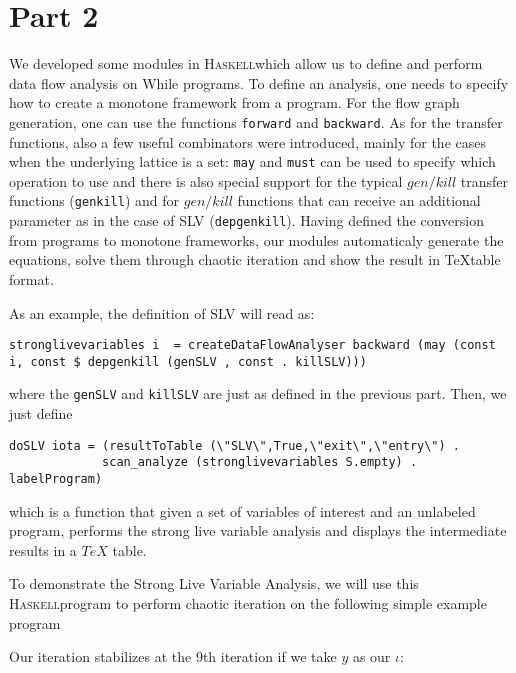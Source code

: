 \documentclass[a4wide,12pt]{article}
\def\haskell{\textsc{Haskell}}
\def\program#1{\fbox{\begin{minipage}{0.5\textwidth}\protect{$\begin{array}{ll} #1 \end{array}$}\end{minipage}}}
\def\hs#1{\texttt{#1}}
\begin{document}
 
\section{Part 2}
 
We developed some modules in \haskell which allow us to define and perform
data flow analysis on While programs. To define an analysis,
one needs to specify how to create a monotone framework from a program.
For the flow graph generation, one can use the functions \hs{forward} and \hs{backward}.
As for the transfer functions, also a few useful combinators were introduced, mainly
for the cases when the underlying lattice is a set: \hs{may} and \hs{must}
can be used to specify which operation to use and there is also special support
for the typical $gen/kill$ transfer functions (\hs{genkill}) and for
$gen/kill$ functions that can receive an additional parameter as in the case of SLV
(\hs{depgenkill}). Having defined the conversion from programs to monotone frameworks,
our modules automaticaly generate the equations, solve them through chaotic iteration
and show the result in \TeX table format. 

As an example, the definition of SLV will read as:

{\small
\begin{verbatim}
stronglivevariables i  = createDataFlowAnalyser backward (may (const i, const $ depgenkill (genSLV , const . killSLV)))
\end{verbatim}
}

\noindent
where the \hs{genSLV} and \hs{killSLV} are just as defined in the previous part. Then, we just define

{\small
\begin{verbatim}
doSLV iota = (resultToTable (\"SLV\",True,\"exit\",\"entry\") .
             scan_analyze (stronglivevariables S.empty) . labelProgram)
\end{verbatim}
}

\noindent
which is a function that given a set of variables of interest
and an unlabeled program, performs the strong live variable analysis and displays
the intermediate results in a $TeX$ table.


To demonstrate the Strong Live Variable Analysis, we will use this \haskell program
to perform chaotic iteration on the following simple example program

\program{}
 
Our iteration stabilizes at the 9th iteration if we take $y$ as our $\iota$:
 
\end{document}
